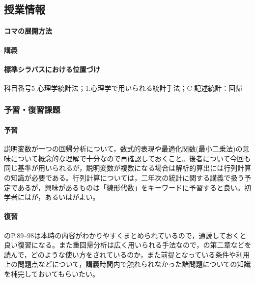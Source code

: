 \subsection{授業情報}
\paragraph{コマの展開方法}
講義
\paragraph{標準シラバスにおける位置づけ}
科目番号5 心理学統計法；1.心理学で用いられる統計手法；C 記述統計：回帰
\subsubsection{予習・復習課題}
\paragraph{予習}
説明変数が一つの回帰分析について，数式的表現や最適化関数(最小二乗法)の意味について概念的な理解で十分なので再確認しておくこと。後者について今回も同じ基準が用いられるが，説明変数が複数になる場合は解析的算出には行列計算の知識が必要である。行列計算については，二年次の統計に関する講義で扱う予定であるが，興味があるものは「線形代数」をキーワードに予習すると良い。初学者には\citet{結城201810}が，あるいは\citet{岡太200804}がよい。
\paragraph{復習}
\citet{豊田201706}のP.89--98は本時の内容がわかりやすくまとめられているので，通読しておくと良い復習になる。また重回帰分析は広く用いられる手法なので，\citet{kosugi2016a}の第二章などを読んで，どのような使い方をされているのか，また前提となっている条件や利用上の問題点などについて，講義時間内で触れられなかった諸問題についての知識を補完しておいてもらいたい。
